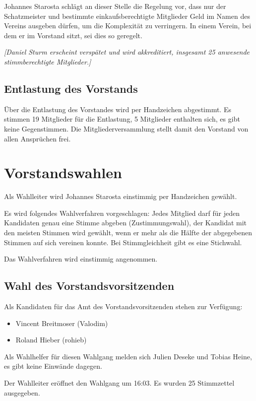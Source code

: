 \documentclass[a4paper,12pt]{scrartcl}
\begin{document}
Johannes Starosta schlägt an dieser Stelle die Regelung vor, dass nur der
Schatzmeister und bestimmte einkaufsberechtigte Mitglieder Geld im Namen des
Vereins ausgeben dürfen, um die Komplexität zu verringern. In einem Verein, bei
dem er im Vorstand sitzt, sei dies so geregelt.

\emph{[Daniel Sturm erscheint verspätet und wird akkreditiert, insgesamt 25
anwesende stimmberechtigte Mitglieder.]}

\subsection{Entlastung des Vorstands}
Über die Entlastung des Vorstandes wird per Handzeichen abgestimmt. Es stimmen
19 Mitglieder für die Entlastung, 5 Mitglieder enthalten sich, es gibt keine
Gegenstimmen. Die Mitgliederversammlung stellt damit den Vorstand von allen
Ansprüchen frei.

\section{Vorstandswahlen}
Als Wahlleiter wird Johannes Starosta einstimmig per Handzeichen gewählt.

Es wird folgendes Wahlverfahren vorgeschlagen: Jedes Mitglied darf für jeden
Kandidaten genau eine Stimme abgeben (Zustimmungswahl), der Kandidat mit den
meisten Stimmen wird gewählt, wenn er mehr als die Hälfte der abgegebenen
Stimmen auf sich vereinen konnte. Bei Stimmgleichheit gibt es eine Stichwahl.

Das Wahlverfahren wird einstimmig angenommen.

\subsection{Wahl des Vorstandsvorsitzenden}
Als Kandidaten für das Amt des Vorstandsvorsitzenden stehen zur Verfügung:
\begin{itemize}
  \item Vincent Breitmoser (Valodim)
  \item Roland Hieber (rohieb)
\end{itemize}

Als Wahlhelfer für diesen Wahlgang melden sich Julien Deseke und Tobias Heine,
es gibt keine Einwände dagegen.

Der Wahlleiter eröffnet den Wahlgang um 16:03. Es wurden 25 Stimmzettel
ausgegeben.
\end{document}
